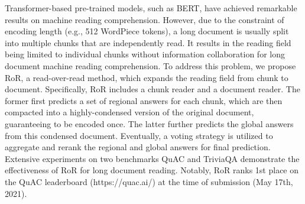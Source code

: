 Transformer-based pre-trained models, such as BERT, have achieved remarkable results on machine reading comprehension. However, due to the constraint of encoding length (e.g., 512 WordPiece tokens), a long document is usually split into multiple chunks that are independently read. It results in the reading field being limited to individual chunks without information collaboration for long document machine reading comprehension. To address this problem, we propose RoR, a read-over-read method, which expands the reading field from chunk to document. Specifically, RoR includes a chunk reader and a document reader. The former first predicts a set of regional answers for each chunk, which are then compacted into a highly-condensed version of the original document, guaranteeing to be encoded once. The latter further predicts the global answers from this condensed document. Eventually, a voting strategy is utilized to aggregate and rerank the regional and global answers for final prediction. Extensive experiments on two benchmarks QuAC and TriviaQA demonstrate the effectiveness of RoR for long document reading. Notably, RoR ranks 1st place on the QuAC leaderboard (https://quac.ai/) at the time of submission (May 17th, 2021).

